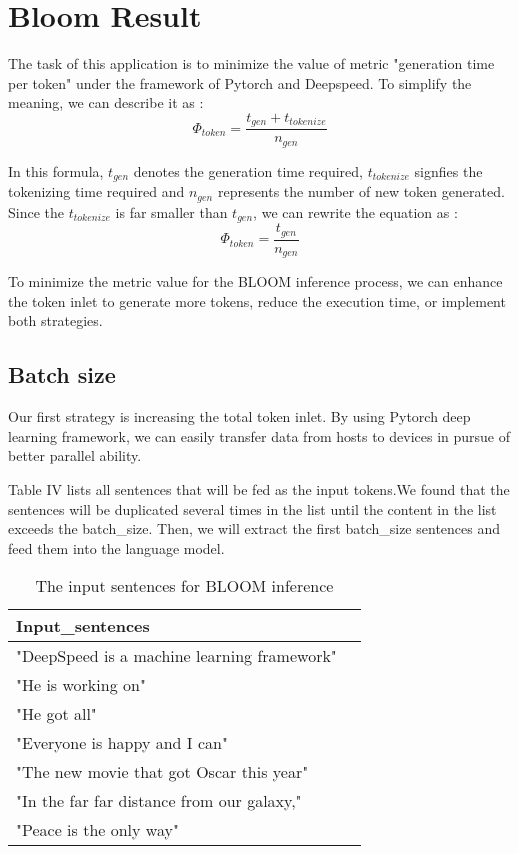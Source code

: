 \pgfplotsset{compat=1.17}

\section{Bloom Result}
\label{sec:BLOOM}
The task of this application is to minimize the value of metric "generation time per token" under the framework of Pytorch and Deepspeed. To simplify the meaning, we can describe it as : \\
\[\Phi_{token} = \frac{t_{gen} + t_{tokenize}}{n_{gen}}\]

In this formula, \(t_{gen}\) denotes the generation time required, \(t_{tokenize}\) signfies the tokenizing time required and \(n_{gen}\) represents the number of new token generated. Since the \(t_{tokenize}\) is far smaller than \(t_{gen}\), we can rewrite the equation as : \\
\[\Phi_{token} = \frac{t_{gen}}{n_{gen}}\]

To minimize the metric value for the BLOOM inference process, we can enhance the token inlet to generate more tokens, reduce the execution time, or implement both strategies.


\subsection{Batch size}
Our first strategy is increasing the total token inlet. By using Pytorch deep learning framework, we can easily transfer data from hosts to devices in pursue of better parallel ability.

Table IV lists all sentences that will be fed as the input tokens.We found that the sentences will be duplicated several times in the list until the content in the list exceeds the batch\_size. Then, we will extract the first batch\_size sentences and feed them into the language model.

\begin{table}[t]
    \centering
    \caption{The input sentences for BLOOM inference}
    \begin{tabular}{ll}
        \toprule
        Input\_sentences  \\
        \midrule
        "DeepSpeed is a machine learning framework" \\
        "He is working on" \\
        "He got all" \\
        "Everyone is happy and I can" \\
        "The new movie that got Oscar this year" \\
        "In the far far distance from our galaxy," \\
        "Peace is the only way" \\
        \bottomrule
    \end{tabular}
    \label{table:bloom-input}
\end{table}

